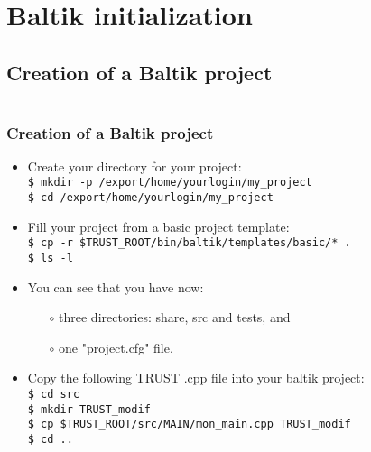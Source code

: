 \documentclass[10pt, hyperref={unicode=true,pdfusetitle, bookmarks=true,bookmarksnumbered=false,bookmarksopen=false, breaklinks=false,pdfborder={0 0 1},backref=true,colorlinks=true,linkcolor=darkblue,pageanchor, urlcolor=darkblue}]{beamer}
\begin{document}
\section{{\bf{Baltik initialization}}}
\subsection{{\bf{Creation of a Baltik project}}}
\begin{frame}
\begin{columns}[c] 
\tableofcontents[sections={1-3},currentsection, currentsubsection]
\tableofcontents[sections={4-8},currentsection, currentsubsection]
\end{columns}
\end{frame}
\begin{frame}
\frametitle{Creation of a Baltik project}
\begin{block}{}

\begin{itemize}
\item Create your directory for your project:\\
\texttt{\$ mkdir -p /export/home/yourlogin/my\_project}\\
\texttt{\$ cd /export/home/yourlogin/my\_project}

\item Fill your project from a basic project template:\\
\texttt{\$ cp -r \$TRUST\_ROOT/bin/baltik/templates/basic/* .}\\
\texttt{\$ ls -l}

\item You can see that you have now:
    \begin{itemize}
    \item [$\circ$] three directories: share, src and tests, and
    \item [$\circ$] one "project.cfg" file.
    \end{itemize}

\item Copy the following TRUST .cpp file into your baltik project:\\
\texttt{\$ cd src}\\
\texttt{\$ mkdir TRUST\_modif} \\
\texttt{\$ cp \$TRUST\_ROOT/src/MAIN/mon\_main.cpp TRUST\_modif}\\
\texttt{\$ cd ..}
\end{itemize}

\end{block}
\end{frame}
\end{document}
